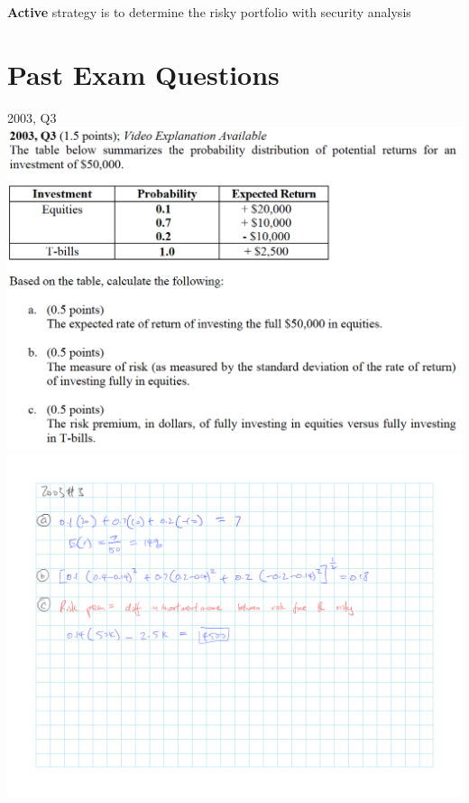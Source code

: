 \documentclass[]{book}
\theoremstyle{definition}
\theoremstyle{definition}
\theoremstyle{remark}
\begin{document}
\textbf{Active} strategy is to determine the risky portfolio with
security analysis

\section{Past Exam Questions}\label{past-exam-questions}

 2003, Q3 \includegraphics{questions/2003-3Q.png}
\includegraphics{questions/2003-3A.png}
\end{document}
